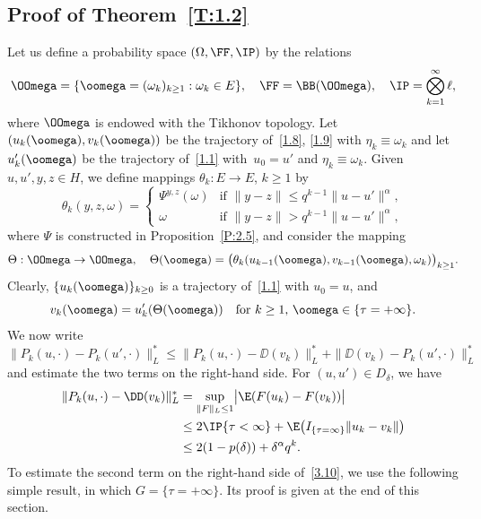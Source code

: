 \subsection{Proof of Theorem~\ref{T:1.2}}
\label{s3.2}
Let us define a probability space $(\Omega,\FF,\IP)$ by the relations\vspace*{-3pt}
\[
\OOmega=\{\oomega=(\omega_k)_{k\ge1}:\omega_k\in E\}, \quad
\FF=\BB(\OOmega),\quad \IP=\bigotimes_{k=1}^\infty\ell,
\]
where $\OOmega$ is endowed with the Tikhonov topology.
Let $(u_k(\oomega), v_k(\oomega))$ be the trajectory of~\eqref{1.8}, \eqref{1.9} with $\eta_k\equiv\omega_k$ and let~$u_k'(\oomega)$ be the trajectory of~\eqref{1.1} with~$u_0=u'$ and $\eta_k\equiv\omega_k$. Given $u,u',y,z\in H$, we define mappings $\theta_k:E\to E$, $k\ge1$ by\vspace*{-3pt}
\begin{equation} \label{3.08}
\theta_k(y,z,\omega)
=
\begin{cases}
\varPsi^{y,z}(\omega)
&\text{if } \|y-z\|
\le q^{k-1}\|u-u'\|^\alpha,\\[3pt]
\omega &\text{if } \|y-z\|
> q^{k-1}\|u-u'\|^\alpha,
\end{cases}
\end{equation}
where $\Psi$ is constructed in Proposition~\ref{P:2.5}, and consider the mapping
\[
\Theta:\OOmega\to\OOmega,\quad
\Theta(\oomega)
=\bigl(\theta_k(u_{k-1}(\oomega),v_{k-1}(\oomega),\omega_k)\bigr)_{k\ge1}.
\]
Clearly, $\{u_k(\oomega)\}_{k\ge0}$ is a trajectory of~\eqref{1.1} with $u_0=u$, and
\begin{equation} \label{3.09}
v_k(\oomega)=u_k'(\Theta(\oomega))\quad
\text{for $k\ge1$, $\oomega\in\{\tau=+\infty\}$}.
\end{equation}
We now write\vspace*{-3pt}
\begin{equation} \label{3.10}
\|P_k(u,\cdot)-P_k(u',\cdot)\|_L^*
\le \|P_k(u,\cdot)-\DD(v_k)\|_L^*+\|\DD(v_k)-P_k(u',\cdot)\|_L^*
\end{equation}
and estimate the two terms on the right-hand side. For $(u,u')\in D_\delta$, we have\vspace*{-3pt}
\begin{equation}\label{3.011}
\begin{aligned}
\|P_k(u,\cdot)-\DD(v_k)\|_L^*
&=\sup_{\|F\|_L\le1}\bigl|\E(F(u_k)-F(v_k))\bigr|\\
&\le2\IP\{\tau<\infty\}+\E\bigl(I_{\{\tau=\infty\}}\|u_k-v_k\|\bigr)\\
&\le 2(1-p(\delta))+\delta^\alpha q^{k}.
\end{aligned}
\end{equation}
To estimate the second term on the right-hand side of~\eqref{3.10}, we use the following simple result, in which $G=\{\tau=+\infty\}$. Its proof is given at the end of this section.

